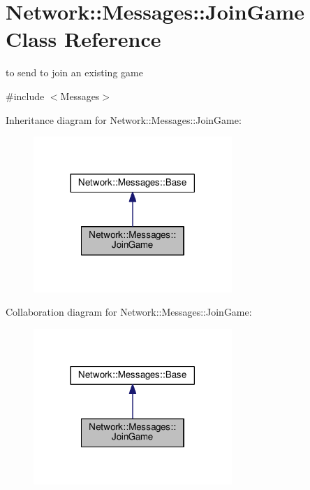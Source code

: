 \hypertarget{class_network_1_1_messages_1_1_join_game}{}\section{Network\+:\+:Messages\+:\+:Join\+Game Class Reference}
\label{class_network_1_1_messages_1_1_join_game}


to send to join an existing game  




{\ttfamily \#include $<$Messages$>$}



Inheritance diagram for Network\+:\+:Messages\+:\+:Join\+Game\+:
\nopagebreak
\begin{figure}[H]
\begin{center}
\leavevmode
\includegraphics[width=213pt]{class_network_1_1_messages_1_1_join_game__inherit__graph}
\end{center}
\end{figure}


Collaboration diagram for Network\+:\+:Messages\+:\+:Join\+Game\+:
\nopagebreak
\begin{figure}[H]
\begin{center}
\leavevmode
\includegraphics[width=213pt]{class_network_1_1_messages_1_1_join_game__coll__graph}
\end{center}
\end{figure}
